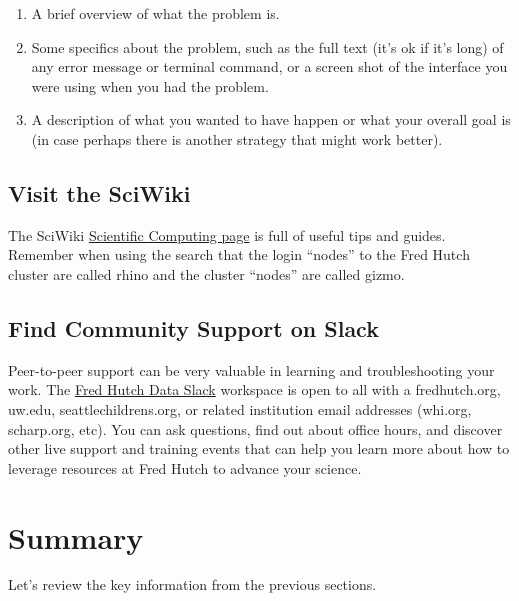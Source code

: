 \documentclass[
]{book}
\providecommand{\tightlist}{%
  \setlength{\itemsep}{0pt}\setlength{\parskip}{0pt}}
\begin{document}
\begin{enumerate}
\def\labelenumi{\arabic{enumi}.}
\tightlist
\item
  A brief overview of what the problem is.
\item
  Some specifics about the problem, such as the full text (it's ok if it's long) of any error message or terminal command, or a screen shot of the interface you were using when you had the problem.
\item
  A description of what you wanted to have happen or what your overall goal is (in case perhaps there is another strategy that might work better).
\end{enumerate}

\hypertarget{visit-the-sciwiki}{%
\section*{Visit the SciWiki}\label{visit-the-sciwiki}}

The SciWiki \href{https://sciwiki.fredhutch.org/scicomputing/comp_index/}{Scientific Computing page} is full of useful tips and guides. Remember when using the search that the login ``nodes'' to the Fred Hutch cluster are called rhino and the cluster ``nodes'' are called gizmo.

\hypertarget{find-community-support-on-slack}{%
\section*{Find Community Support on Slack}\label{find-community-support-on-slack}}

Peer-to-peer support can be very valuable in learning and troubleshooting your work. The \href{https://fhdata.slack.com}{Fred Hutch Data Slack} workspace is open to all with a fredhutch.org, uw.edu, seattlechildrens.org, or related institution email addresses (whi.org, scharp.org, etc). You can ask questions, find out about office hours, and discover other live support and training events that can help you learn more about how to leverage resources at Fred Hutch to advance your science.

\hypertarget{summary}{%
\chapter{Summary}\label{summary}}

Let's review the key information from the previous sections.
\end{document}
